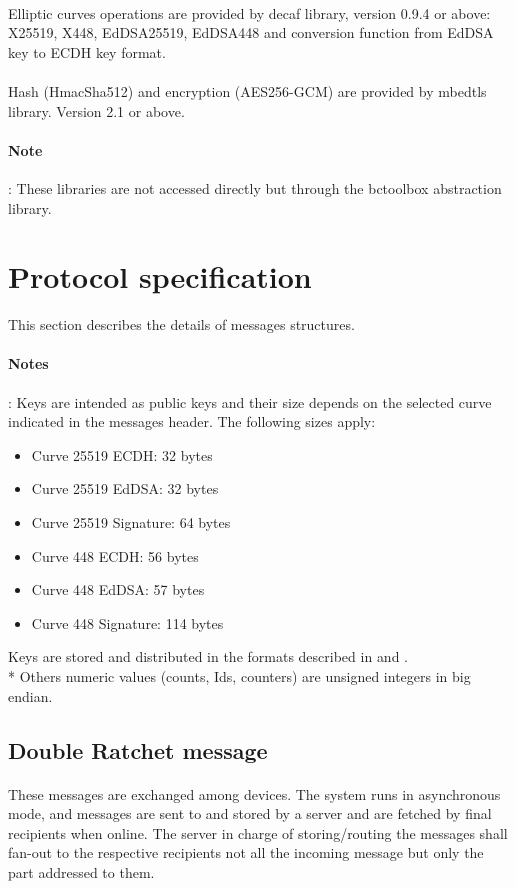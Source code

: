\documentclass[a4paper,11pt]{article}
\begin{document}
    \paragraph{}Elliptic curves operations are provided by decaf library\cite{libdecaf}, version 0.9.4 or above: X25519, X448, EdDSA25519, EdDSA448 and conversion function from EdDSA key to ECDH key format.
    \paragraph{}Hash (HmacSha512) and encryption (AES256-GCM) are provided by mbedtls library\cite{libmbedtls}. Version 2.1 or above.
    \paragraph{Note}: These libraries are not accessed directly but through the bctoolbox abstraction library.

\section{Protocol specification}
  This section describes the details of messages structures.
  \paragraph*{Notes}: Keys are intended as public keys and their size depends on the selected curve indicated in the messages header. The following sizes apply:
  \begin{itemize}
    \item Curve 25519 ECDH: 32 bytes
    \item Curve 25519 EdDSA: 32 bytes
    \item Curve 25519 Signature: 64 bytes
    \item Curve 448 ECDH: 56 bytes
    \item Curve 448 EdDSA: 57 bytes
    \item Curve 448 Signature: 114 bytes
  \end{itemize}
  Keys are stored and distributed in the formats described in \cite{rfc7748} and \cite{rfc8032}.\\*
  Others numeric values (counts, Ids, counters) are unsigned integers in big endian.
  
  \subsection{Double Ratchet message}
    \paragraph*{}These messages are exchanged among devices. The system runs in asynchronous mode, and messages are sent to and stored by a server and are fetched by final recipients when online. The server in charge of storing/routing the messages shall fan-out to the respective recipients not all the incoming message but only the part addressed to them.
\end{document}
